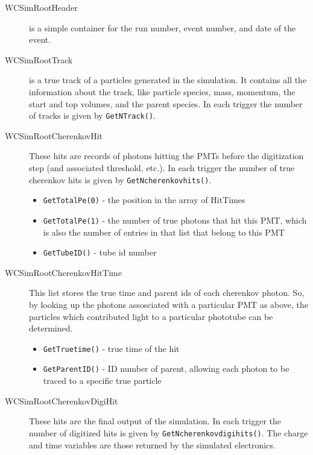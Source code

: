 \begin{description}
\begin{description}
    \begin{description}
      \item[WCSimRootHeader] is a simple container for the run number, event number, and date of the event.
      \item[WCSimRootTrack] is a true track of a particles generated in the simulation. It contains all the information about the track, like particle species, mass, momentum, the start and top volumes, and the parent species.  In each trigger the number of tracks is given by \texttt{GetNTrack()}.  %
      \item[WCSimRootCherenkovHit] These hits are records of photons hitting the PMTs before the digitization step (and associated threshold, etc.). In each trigger the number of true cherenkov hits is given by \texttt{GetNcherenkovhits()}.
          \begin{itemize}
          \item \texttt{GetTotalPe(0)} - the position in the array of HitTimes
          \item \texttt{GetTotalPe(1)} - the number of true photons that hit this PMT, which is also the number of entries in that list that belong to this PMT
          \item \texttt{GetTubeID()} - tube id number
          \end{itemize}
      \item[WCSimRootCherenkovHitTime] This list stores the true time and parent ids of each cherenkov photon.  So, by looking up the photons assosciated with a particular PMT as above, the particles which contributed light to a particular phototube can be determined.
          \begin{itemize}
          \item \texttt{GetTruetime()} - true time of the hit
          \item \texttt{GetParentID()} - ID number of parent, allowing each photon to be traced to a specific true particle
          \end{itemize}
      \item[WCSimRootCherenkovDigiHit] These hits are the final output of the simulation. In each trigger the number of digitized hits is given by \texttt{GetNcherenkovdigihits()}.  The charge and time variables are those returned by the simulated electronics.

\end{description}
\end{description}
\end{description}
